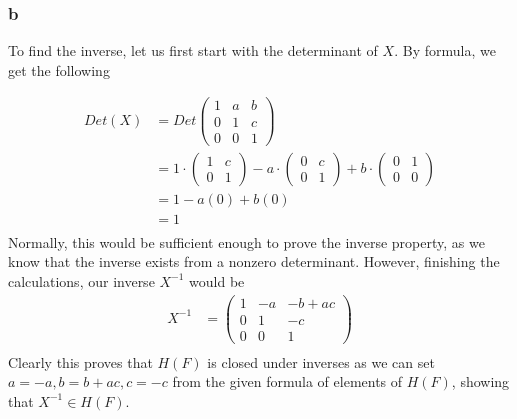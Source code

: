 \documentclass[11 pt]{article}
\theoremstyle{definition}
\theoremstyle{remark}
\begin{document}
\subsubsection*{b}

To find the inverse, let us first start with the determinant of $X$. By formula, we get the following

\begin{align*}
Det(X) &= Det \begin{pmatrix}
1 & a & b\\
0 & 1 & c\\
0 & 0 & 1
\end{pmatrix} \\
    &= 1 \cdot \begin{pmatrix}
    1 & c \\
    0 & 1
    \end{pmatrix}
    - a \cdot \begin{pmatrix}
    0 & c \\
    0 & 1
    \end{pmatrix}
    + b \cdot \begin{pmatrix}
    0 & 1 \\
    0 & 0
    \end{pmatrix} \\
    &= 1-a(0) + b(0) \\
    &= 1
\\
\end{align*}
Normally, this would be sufficient enough to prove the inverse property, as we know that the inverse exists from a nonzero determinant. However, finishing the calculations, our inverse $X^{-1}$ would be 
\begin{align*}
X^{-1} &= \begin{pmatrix}
1 & -a & -b+ac\\
0 & 1 & -c\\
0 & 0 & 1
\end{pmatrix}
\\
\end{align*}
Clearly this proves that $H(F)$ is closed under inverses as we can set $a = -a, b = b+ac, c = -c$ from the given formula of elements of $H(F)$, showing that $X^{-1} \in H(F)$.
\end{document}
